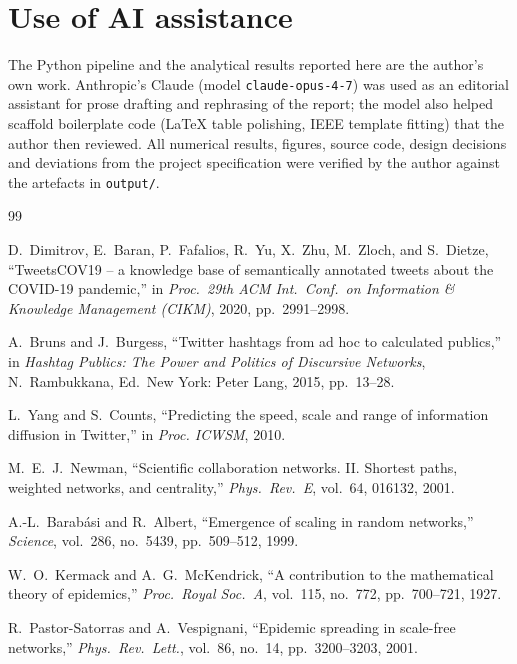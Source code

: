 \documentclass[conference]{IEEEtran}
\begin{document}
\section*{Use of AI assistance}
\label{sec:ai}
The Python pipeline and the analytical results reported here
are the author's own work.  Anthropic's Claude (model
\texttt{claude-opus-4-7}) was used as an editorial assistant
for prose drafting and rephrasing of the report; the model
also helped scaffold boilerplate code (LaTeX table polishing,
IEEE template fitting) that the author then reviewed.  All numerical
results, figures, source code, design decisions and
deviations from the project specification were verified by
the author against the artefacts in \texttt{output/}.


\begin{thebibliography}{99}

D.~Dimitrov, E.~Baran, P.~Fafalios, R.~Yu, X.~Zhu,
M.~Zloch, and S.~Dietze,
``TweetsCOV19 -- a knowledge base of semantically annotated
  tweets about the COVID-19 pandemic,''
in \emph{Proc.\ 29th ACM Int.\ Conf.\ on Information \&
  Knowledge Management (CIKM)}, 2020, pp.~2991--2998.

A.~Bruns and J.~Burgess,
``Twitter hashtags from ad hoc to calculated publics,''
in \emph{Hashtag Publics: The Power and Politics of
Discursive Networks}, N.~Rambukkana, Ed.\
New York: Peter Lang, 2015, pp.~13--28.

L.~Yang and S.~Counts,
``Predicting the speed, scale and range of information
  diffusion in Twitter,''
in \emph{Proc. ICWSM}, 2010.

M.~E.~J.~Newman,
``Scientific collaboration networks. II. Shortest paths,
  weighted networks, and centrality,''
\emph{Phys.\ Rev.\ E}, vol.~64, 016132, 2001.

A.-L.~Barab{\'a}si and R.~Albert,
``Emergence of scaling in random networks,''
\emph{Science}, vol.~286, no.~5439, pp.~509--512, 1999.

W.~O.~Kermack and A.~G.~McKendrick,
``A contribution to the mathematical theory of epidemics,''
\emph{Proc.\ Royal Soc.\ A}, vol.~115, no.~772, pp.~700--721,
1927.

R.~Pastor-Satorras and A.~Vespignani,
``Epidemic spreading in scale-free networks,''
\emph{Phys.\ Rev.\ Lett.}, vol.~86, no.~14, pp.~3200--3203, 2001.


\end{thebibliography}
\end{document}
